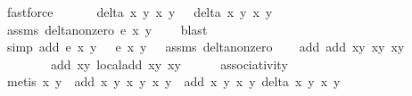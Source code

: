 \begin{isabellebody}
\ fastforce{\isacharplus}\isanewline
\ \ \ \isamarkupfalse%
\ \isamarkupfalse%
\ {\isachardoublequoteopen}delta\ x{}{\isacharprime}\ y{}{\isacharprime}\ x{}\ y{}\ {\isasymnoteq}\ {}{\isachardoublequoteclose}\ {\isachardoublequoteopen}delta\ x{}\ y{}\ x{}{\isacharprime}\ y{}{\isacharprime}\ {\isasymnoteq}\ {}{\isachardoublequoteclose}\isanewline
\ \ \ \ \ \isamarkupfalse%
\ assms\ delta{\isacharunderscore}non{\isacharunderscore}zero\ {\isacartoucheopen}e\ x{}\ y{}\ {\isacharequal}\ {}{\isacartoucheclose}\ \isamarkupfalse%
\ blast\isanewline
\ \ \ \ \isamarkupfalse%
\ {\isacharparenleft}simp\ add{\isacharcolon}\ {\isacartoucheopen}e\ x{}\ y{}\ {\isacharequal}\ {}{\isacartoucheclose}\ {\isacartoucheopen}e\ x{}{\isacharprime}\ y{}{\isacharprime}\ {\isacharequal}\ {}{\isacartoucheclose}\ assms\ delta{\isacharunderscore}non{\isacharunderscore}zero{\isacharparenright}\isanewline
\isanewline
\ \ \isamarkupfalse%
\ {\isachardoublequoteopen}add\ {\isacharparenleft}add\ {\isacharparenleft}x{}{\isacharcomma}y{}{\isacharparenright}\ {\isacharparenleft}x{}{\isacharcomma}y{}{\isacharparenright}{\isacharparenright}\ {\isacharparenleft}x{}{\isacharcomma}y{}{\isacharparenright}\ {\isacharequal}\isanewline
\ \ \ \ \ \ \ \ add\ {\isacharparenleft}x{}{\isacharcomma}y{}{\isacharparenright}\ {\isacharparenleft}local{\isachardot}add\ {\isacharparenleft}x{}{\isacharcomma}y{}{\isacharparenright}\ {\isacharparenleft}x{}{\isacharcomma}y{}{\isacharparenright}{\isacharparenright}{\isachardoublequoteclose}\isanewline
\ \ \ \ \isamarkupfalse%
\ associativity\ \isanewline
\ \ \ \ \isamarkupfalse%
\ {\isacharparenleft}metis\ {\isacartoucheopen}{\isacharparenleft}x{}{\isacharprime}{\isacharcomma}\ y{}{\isacharprime}{\isacharparenright}\ {\isacharequal}\ add\ {\isacharparenleft}x{}{\isacharcomma}\ y{}{\isacharparenright}\ {\isacharparenleft}x{}{\isacharcomma}\ y{}{\isacharparenright}{\isacartoucheclose}\ {\isacartoucheopen}{\isacharparenleft}x{}{\isacharprime}{\isacharcomma}\ y{}{\isacharprime}{\isacharparenright}\ {\isacharequal}\ add\ {\isacharparenleft}x{}{\isacharcomma}\ y{}{\isacharparenright}\ {\isacharparenleft}x{}{\isacharcomma}\ y{}{\isacharparenright}{\isacartoucheclose}\ {\isacartoucheopen}delta\ x{}\ y{}\ x{}\ y{}\ {\isasymnoteq}\ {}{\isacartoucheclose}\ \isanewline

\end{isabellebody}
